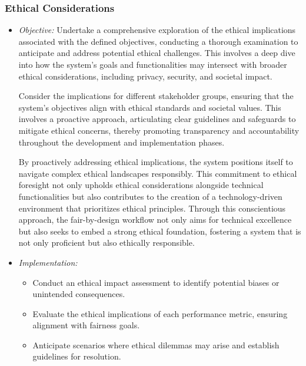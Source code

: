 \documentclass[12pt,a4paper,openright,twoside]{book}
\begin{document}
\subsubsection{Ethical Considerations}

\begin{itemize}

    \item \emph{Objective:} Undertake a comprehensive exploration of the ethical implications associated with the defined objectives, conducting a thorough examination to anticipate and address potential ethical challenges. This involves a deep dive into how the system's goals and functionalities may intersect with broader ethical considerations, including privacy, security, and societal impact.

    Consider the implications for different stakeholder groups, ensuring that the system's objectives align with ethical standards and societal values. This involves a proactive approach, articulating clear guidelines and safeguards to mitigate ethical concerns, thereby promoting transparency and accountability throughout the development and implementation phases.
    
    By proactively addressing ethical implications, the system positions itself to navigate complex ethical landscapes responsibly. This commitment to ethical foresight not only upholds ethical considerations alongside technical functionalities but also contributes to the creation of a technology-driven environment that prioritizes ethical principles. Through this conscientious approach, the fair-by-design workflow not only aims for technical excellence but also seeks to embed a strong ethical foundation, fostering a system that is not only proficient but also ethically responsible.

    \item \emph{Implementation:}

        \begin{itemize}

            \item Conduct an ethical impact assessment to identify potential biases or unintended consequences.

            \item Evaluate the ethical implications of each performance metric, ensuring alignment with fairness goals.

            \item Anticipate scenarios where ethical dilemmas may arise and establish guidelines for resolution.

        \end{itemize}

\end{itemize}
\end{document}
